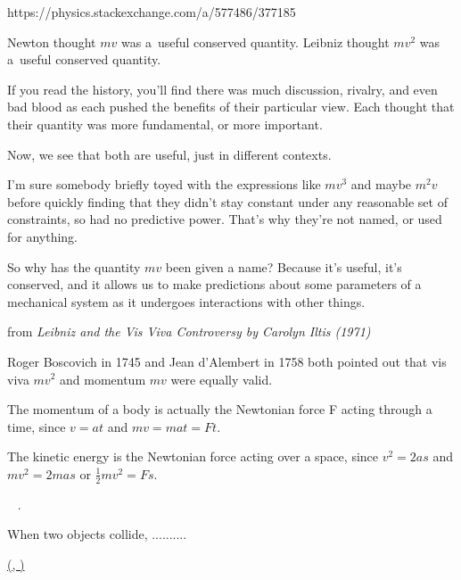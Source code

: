 {\small

https://physics.stackexchange.com/a/577486/377185

Newton thought ${m v}$ was a~useful conserved quantity. Leibniz thought ${m v^2}$ was a~useful conserved quantity.

If you read the history, you’ll find there was much discussion, rivalry, and even bad blood as each pushed the benefits of their particular view. Each thought that their quantity was more fundamental, or more important.

Now, we see that both are useful, just in different contexts.

I’m sure somebody briefly toyed with the expressions like ${m v^3}$ and maybe ${m^2 v}$ before quickly finding that they didn’t stay constant under any reasonable set of constraints, so had no predictive power. That’s why they’re not named, or used for anything.

So why has the quantity ${m v}$ been given a name? Because it’s useful, it’s conserved, and it allows us to make predictions about some parameters of a mechanical system as it undergoes interactions with other things.

\par}

from \emph{Leibniz and the Vis Viva Controversy by Carolyn Iltis (1971)}

Roger Boscovich in 1745 and Jean d’Alembert in 1758 both pointed out that vis viva ${mv^2}$ and momentum ${mv}$ were equally valid.

The momentum of a body is actually the Newtonian force F acting through a time, since ${v = at}$ and ${mv = mat = Ft}$.

The kinetic energy is the Newtonian force acting over a space, since ${v^2 = 2as}$ and ${mv^2 = 2mas}$ or ${\frac{1}{2} mv^2 = Fs}$.

~
.

When two objects collide, ..........

\href{https://en.wikipedia.org/wiki/Momentum}{(,
)
}

